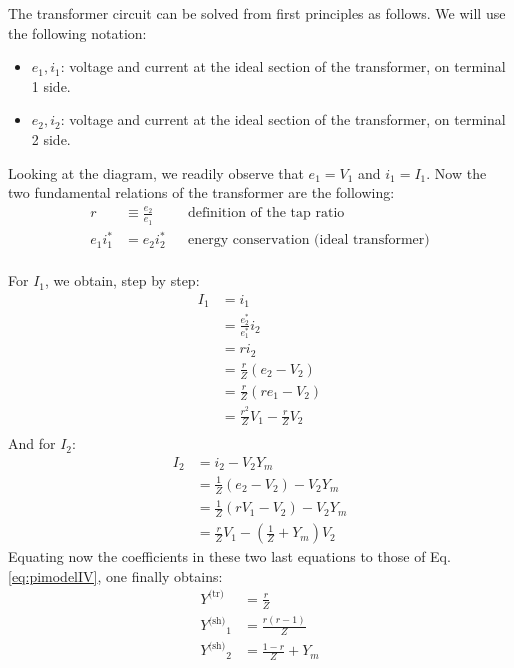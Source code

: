\documentclass[a4paper,11pt]{article}
\newcommand{\Ytr}{\ensuremath{Y^{\textrm{(tr)}}}}
\newcommand{\Ysh}{\ensuremath{Y^{\textrm{(sh)}}}}
\begin{document}
The transformer circuit can be solved from first principles as follows. We will
use the following notation:
\begin{itemize}
\item $e_1, i_1$: voltage and current at the ideal section of the transformer,
  on terminal 1 side.
\item $e_2, i_2$: voltage and current at the ideal section of the transformer,
  on terminal 2 side.
\end{itemize}
Looking at the diagram, we readily observe that $e_1=V_1$ and $i_1=I_1$. Now the
two fundamental relations of the transformer are the following:
\begin{align*}
    r & \equiv \frac{e_2}{e_1}  &  & \text{definition of the tap ratio} \\
    e_1 i_1^* & = e_2 i_2^* &  & \text{energy conservation (ideal transformer)} \\
\end{align*}

For $I_1$, we obtain, step by step:
\begin{equation*}
  \begin{split}
    I_1 & = i_1 \\
    & = \frac{e_2^*}{e_1^*} i_2 \\
    & = r i_2 \\
    & = \frac{r}{Z} (e_2 - V_2) \\
    & = \frac{r}{Z} (r e_1 - V_2) \\
    & = \frac{r^2}{Z} V_1 - \frac{r}{Z} V_2 \\
  \end{split}
\end{equation*}
And for $I_2$:
\begin{equation*}
  \begin{split}
    I_2 & = i_2 - V_2 Y_m \\
    & = \frac{1}{Z} (e_2 - V_2) - V_2 Y_m \\
    & = \frac{1}{Z} (r V_1 - V_2) - V_2 Y_m \\
    & = \frac{r}{Z} V_1  - \left( \frac{1}{Z} + Y_m \right) V_2
  \end{split}
\end{equation*}
Equating now the coefficients in these two last equations to those of
Eq.\eqref{eq:pimodelIV}, one finally obtains:
\begin{equation}
  \begin{split}
    \Ytr & = \frac{r}{Z} \\
    \Ysh_1 & = \frac{r(r-1)}{Z} \\
    \Ysh_2 & = \frac{1-r}{Z} + Y_m
  \end{split}
\end{equation}






\clearpage
\printbibliography
\end{document}
